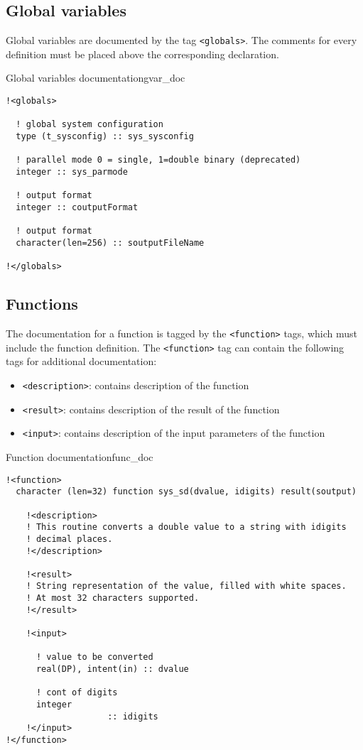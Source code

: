 \subsection{Global variables}

Global variables are documented by the tag \verb+<globals>+.
The comments for every definition must
be placed above the corresponding declaration.

\begin{code}{Global variables documentation}{gvar_doc}
\begin{verbatim}
!<globals>

  ! global system configuration
  type (t_sysconfig) :: sys_sysconfig

  ! parallel mode 0 = single, 1=double binary (deprecated)
  integer :: sys_parmode

  ! output format
  integer :: coutputFormat

  ! output format
  character(len=256) :: soutputFileName

!</globals>

\end{verbatim}
\end{code}

\subsection{Functions}

The documentation for a function is tagged by the \verb+<function>+ tags, which
must include the function definition. The \verb+<function>+ tag can contain the following
tags for additional documentation:

\begin{itemize}
\item \verb+<description>+: contains description of the function
\item \verb+<result>+: contains description of the result of the function
\item \verb+<input>+: contains description of the input parameters of the function
\end{itemize}

\begin{code}{Function documentation}{func_doc}
\begin{verbatim}
!<function>
  character (len=32) function sys_sd(dvalue, idigits) result(soutput)

    !<description>
    ! This routine converts a double value to a string with idigits
    ! decimal places.
    !</description>

    !<result>
    ! String representation of the value, filled with white spaces.
    ! At most 32 characters supported.
    !</result>

    !<input>

      ! value to be converted
      real(DP), intent(in) :: dvalue
    
      ! cont of digits
      integer
                    :: idigits
    !</input>
!</function>
\end{verbatim}
\end{code}


